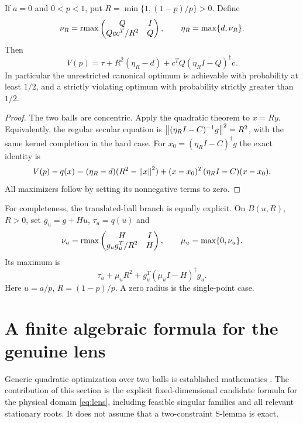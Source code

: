 \begin{corollary}
\label{cor:canonicalfrontier}
If $a=0$ and $0<p<1$, put $R=\min\{1,(1-p)/p\}>0$. Define
\[
 \nu_R=\operatorname{rmax}\begin{pmatrix}Q&I\\Qcc^T/R^2&Q\end{pmatrix},
 \qquad\eta_R=\max\{d,\nu_R\}.
\]
Then
\begin{equation}\label{eq:canonicalfrontier}\boxed{
 V(p)=\tau+R^2(\eta_R-d)+c^TQ(\eta_RI-Q)^\dagger c.}
\end{equation}
In particular the unrestricted canonical optimum is achievable with
probability at least $1/2$, and a strictly violating optimum with
probability strictly greater than $1/2$.
\end{corollary}
\begin{proof}
The two balls are concentric. Apply the quadratic theorem to $x=Ry$.
Equivalently, the regular secular equation is
$\left\lVert(\eta_RI-C)^{-1}g\right\rVert^2=R^2$, with the same kernel completion in
the hard case. For $x_0=(\eta_RI-C)^\dagger g$ the exact identity is
\[
 V(p)-q(x)=(\eta_R-d)(R^2-\left\lVert x\right\rVert^2)
       +(x-x_0)^T(\eta_RI-C)(x-x_0).
\]
All maximizers follow by setting its nonnegative terms to zero.
\end{proof}

For completeness, the translated-ball branch is equally explicit. On
$B(u,R)$, $R>0$, set $g_u=g+Hu$, $\tau_u=q(u)$ and
\[
 \nu_u=\operatorname{rmax}\begin{pmatrix}H&I\\g_ug_u^T/R^2&H\end{pmatrix},
 \qquad\mu_u=\max\{0,\nu_u\}.
\]
Its maximum is
\begin{equation}\label{eq:translatedball}
 \tau_u+\mu_uR^2+g_u^T(\mu_uI-H)^\dagger g_u.
\end{equation}
Here $u=a/p$, $R=(1-p)/p$. A zero radius is the single-point case.

\section{A finite algebraic formula for the genuine lens}
\label{sec:finite_lens}

Generic quadratic optimization over two balls is established mathematics
\cite{twoballs,rontsis}. The contribution of this section is the explicit
fixed-dimensional candidate formula for the physical domain
\eqref{eq:lens}, including feasible singular families and all relevant
stationary roots. It does not assume that a two-constraint S-lemma is exact.

